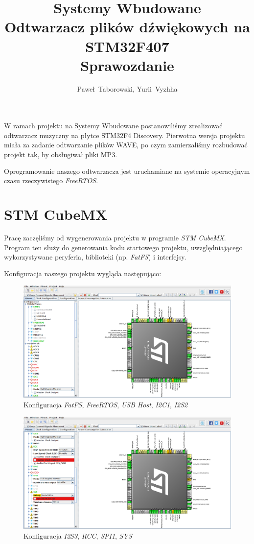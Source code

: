 \documentclass[12pt,a4paper]{article}
\author{Paweł~Taborowski, Yurii~Vyzhha}
\title{Systemy Wbudowane \\Odtwarzacz plików dźwiękowych na STM32F407\\Sprawozdanie}
\begin{document}
  \maketitle
W ramach projektu na Systemy Wbudowane postanowiliśmy zrealizować odtwarzacz muzyczny na płytce  STM32F4 Discovery. Pierwotna wersja projektu miała za zadanie odtwarzanie plików WAVE, po czym zamierzaliśmy rozbudować projekt tak, by obsługiwał pliki MP3.

Oprogramowanie naszego odtwarzacza jest uruchamiane na systemie operacyjnym czasu rzeczywistego \textit{FreeRTOS}.

\section{STM CubeMX}
Pracę zaczęliśmy od wygenerowania projektu w programie \emph{STM CubeMX}. Program ten służy do generowania kodu startowego projektu, uwzględniającego wykorzystywane peryferia, biblioteki (np. \textit{FatFS}) i interfejsy.

Konfiguracja naszego projektu wygląda następująco:

\begin{figure}[H]
 \centerline{\includegraphics[width=\textwidth]{img/img1}}
 \caption{Konfiguracja \emph{FatFS}, \emph{FreeRTOS}, \emph{USB Host}, \emph{I2C1}, \emph{I2S2}}
 \label{img1}
\end{figure}

\begin{figure}[H]
 \centerline{\includegraphics[width=\textwidth]{img/img2}}
 \caption{Konfiguracja \emph{I2S3}, \emph{RCC}, \emph{SPI1}, \emph{SYS}}
 \label{img2}
\end{figure}
\end{document}
